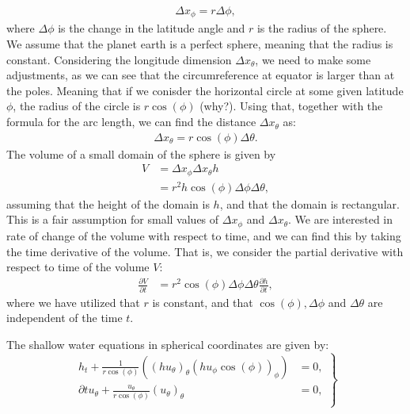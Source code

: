 \begin{align*}
    \Delta x_{\phi} = r \Delta \phi,
\end{align*}
where $\Delta \phi$ is the change in the latitude angle and $r$ is the radius of the sphere.
We assume that the planet earth is a perfect sphere, meaning that the radius is constant.
Considering the longitude dimension $\Delta x_{\theta}$, we need to make some adjustments, as we can see that the circumreference at equator is larger than at the poles.
Meaning that if we conisder the horizontal circle at some given latitude $\phi$, the radius of the circle is $r \cos(\phi)$ (why?).
Using that, together with the formula for the arc length, we can find the distance $\Delta x_{\theta}$ as:
\begin{align*}
    \Delta x_{\theta} = r \cos(\phi) \Delta \theta.
\end{align*}
The volume of a small domain of the sphere is given by 
\begin{align*}
    V &= \Delta x_{\phi} \Delta x_{\theta} h \\
    &= r^2 h \cos(\phi) \Delta \phi \Delta \theta,
\end{align*}
assuming that the height of the domain is $h$, and that the domain is rectangular.
This is a fair assumption for small values of $\Delta x_{\phi}$ and $\Delta x_{\theta}$.
We are interested in rate of change of the volume with respect to time, and we can find this by taking the time derivative of the volume.
That is, we consider the partial derivative with respect to time of the volume $V$:
\begin{align*}
    \frac{\partial V}{\partial t} &= r^2 \cos(\phi) \Delta \phi \Delta \theta \frac{\partial h}{\partial t},
\end{align*}
where we have utilized that $r$ is constant, and that $\cos(\phi), \Delta \phi$ and $\Delta \theta$ are independent of the time $t$.

The shallow water equations in spherical coordinates are given by:
\begin{equation}
    \left.
    \begin{aligned}
        h_t + \frac{1}{r \cos (\phi)} \left( {(h u_\theta)}_{\theta} {(h u_{\phi} \cos(\phi))}_{\phi}  \right) &= 0, \\
        \partial t u_{\theta}  + \frac{u_\theta}{r \cos (\phi)} {(u_\theta)}_\theta  &= 0, \\
    \end{aligned}
    \right\}
\end{equation}







